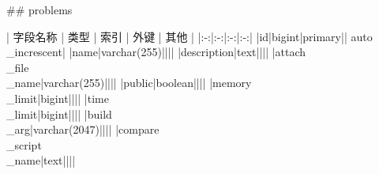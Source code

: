 \documentclass{ctexart}
\begin{document}
\begin{markdown}
\begin{center}
\end{center}

## problems

\begin{center}

| 字段名称 | 类型 | 索引 | 外键 | 其他 |
|:-:|:-:|:-:|:-:|
|id|bigint|primary|| auto\\\_increscent|
|name|varchar(255)||||
|description|text||||
|attach\\\_file\\\_name|varchar(255)||||
|public|boolean||||
|memory\\\_limit|bigint||||
|time\\\_limit|bigint||||
|build\\\_arg|varchar(2047)||||
|compare\\\_script\\\_name|text||||

\end{center}



\end{markdown}
\end{document}
